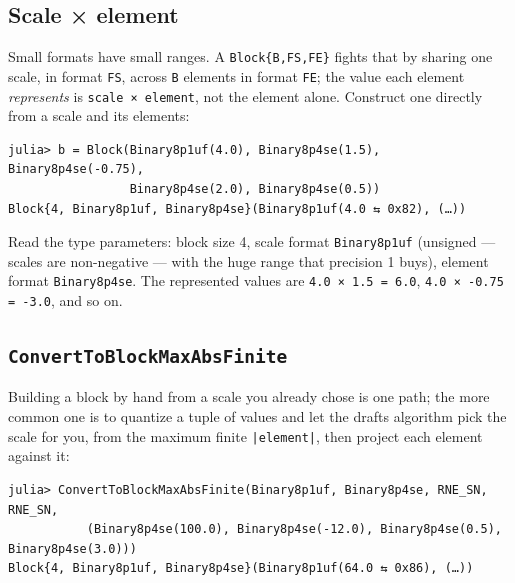 \subsection{Scale × element}



\label{9198442399466125325}{}


Small formats have small ranges. A \texttt{Block\{B,FS,FE\}} fights that by sharing one scale, in format \texttt{FS}, across \texttt{B} elements in format \texttt{FE}; the value each element \emph{represents} is \texttt{scale × element}, not the element alone. Construct one directly from a scale and its elements:




\nopagebreak[4]
\begin{verbatim}
julia> b = Block(Binary8p1uf(4.0), Binary8p4se(1.5), Binary8p4se(-0.75),
                 Binary8p4se(2.0), Binary8p4se(0.5))
Block{4, Binary8p1uf, Binary8p4se}(Binary8p1uf(4.0 ⇆ 0x82), (…))
\end{verbatim}



Read the type parameters: block size 4, scale format \texttt{Binary8p1uf} (unsigned — scales are non-negative — with the huge range that precision 1 buys), element format \texttt{Binary8p4se}. The represented values are \texttt{4.0 × 1.5 = 6.0}, \texttt{4.0 × -0.75 = -3.0}, and so on.



\subsection{\texttt{ConvertToBlockMaxAbsFinite}}



\label{2152059938679189190}{}


Building a block by hand from a scale you already chose is one path; the more common one is to quantize a tuple of values and let the draft{\textquotesingle}s algorithm pick the scale for you, from the maximum finite \texttt{|element|}, then project each element against it:




\nopagebreak[4]
\begin{verbatim}
julia> ConvertToBlockMaxAbsFinite(Binary8p1uf, Binary8p4se, RNE_SN, RNE_SN,
           (Binary8p4se(100.0), Binary8p4se(-12.0), Binary8p4se(0.5), Binary8p4se(3.0)))
Block{4, Binary8p1uf, Binary8p4se}(Binary8p1uf(64.0 ⇆ 0x86), (…))
\end{verbatim}



